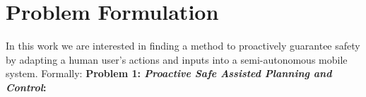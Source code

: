 \documentclass[conference]{IEEEtran}
\begin{document}
    
    
    
    
    
\section{Problem Formulation}
 
In this work we are interested in finding a method to proactively guarantee safety by adapting a human user's actions and inputs into a semi-autonomous mobile system. Formally: 
\textbf{Problem 1: \textit{Proactive Safe Assisted Planning and Control}:} 
    
\end{document}
